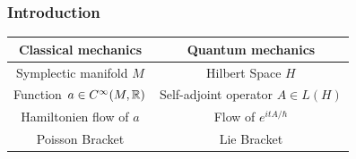 \documentclass[mathserif]{beamer}
\newcommand{\spline}{\hline}
\begin{document}
\begin{frame}
\begin{center}
\begin{picture}
        \end{picture}
      \end{center}

    \end{frame}

\begin{frame}\frametitle{Introduction}
\begin{center}
	\begin{tabular}{|c|c|}
		\spline
	    Classical mechanics & Quantum mechanics\\
		\spline
		Symplectic manifold $M$ & Hilbert Space $H$\\ 
		\spline 
		Function $a\in C^{\infty}(M,\R)$ & Self-adjoint
                                                   operator $A\in L(H)$\\
		\spline
                Hamiltonien flow of $a$ & Flow of $e^{itA/\hbar}$\\
		\spline
		Poisson Bracket & Lie Bracket\\
		\spline
	\end{tabular}\end{center}\vspace{0em}
	\begin{itemize}
	\end{itemize}
\end{frame}
\end{document}
